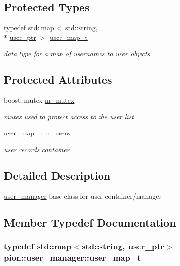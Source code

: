 \subsection*{Protected Types}
\begin{DoxyCompactItemize}
\item 
typedef std\-::map$<$ std\-::string, \\*
\hyperlink{namespacepion_afd2ae32f926db1286ba2e83011456e11}{user\-\_\-ptr} $>$ \hyperlink{classpion_1_1user__manager_a6e856c85929ffbf1a558f61fd7e0b557}{user\-\_\-map\-\_\-t}
\begin{DoxyCompactList}\small\item\em data type for a map of usernames to user objects \end{DoxyCompactList}\end{DoxyCompactItemize}
\subsection*{Protected Attributes}
\begin{DoxyCompactItemize}
\item 
boost\-::mutex \hyperlink{classpion_1_1user__manager_a89489a9cd9499628f9bc764143b06227}{m\-\_\-mutex}
\begin{DoxyCompactList}\small\item\em mutex used to protect access to the user list \end{DoxyCompactList}\item 
\hyperlink{classpion_1_1user__manager_a6e856c85929ffbf1a558f61fd7e0b557}{user\-\_\-map\-\_\-t} \hyperlink{classpion_1_1user__manager_a366cf3ed44fd3f4bb93f430884934f9d}{m\-\_\-users}
\begin{DoxyCompactList}\small\item\em user records container \end{DoxyCompactList}\end{DoxyCompactItemize}


\subsection{Detailed Description}
\hyperlink{classpion_1_1user__manager}{user\-\_\-manager} base class for user container/manager 

\subsection{Member Typedef Documentation}
\hypertarget{classpion_1_1user__manager_a6e856c85929ffbf1a558f61fd7e0b557}{
\subsubsection[{user\-\_\-map\-\_\-t}]{\setlength{\rightskip}{0pt plus 5cm}typedef std\-::map$<$std\-::string, {\bf user\-\_\-ptr}$>$ {\bf pion\-::user\-\_\-manager\-::user\-\_\-map\-\_\-t}\hspace{0.3cm}{\ttfamily [protected]}}}\label{classpion_1_1user__manager_a6e856c85929ffbf1a558f61fd7e0b557}


